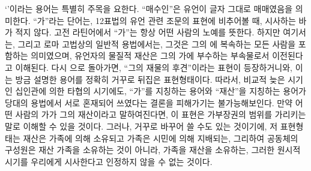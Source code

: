 `'이라는 용어는 특별히 주목을 요한다.
``매수인''은 유언이 글자 그대로 매매였음을 의미한다.
``가''라는 단어는,
12표법의 유언 관련 조문의 표현에 비추어볼 때,
시사하는 바가 적지 않다.
고전 라틴어에서 ``가''는 항상 어떤 사람의 노예를 뜻한다.
하지만 여기서는, 그리고 로마 고법상의 일반적 용법에서는,
그것은 그의 에 복속하는 모든 사람을 포함하는 의미였으며,
유언자의 물질적 재산은 그의 가에 부수하는 부속물로서
이전된다고 이해된다.
다시 으로 돌아가면, ``그의 재물의 후견''이라는
표현이 등장하거니와, 이는 방금 설명한 용어를 정확히 거꾸로 뒤집은 표현형태이다.
따라서,
비교적 늦은 시기인
십인관에 의한 타협의 시기에도,
``가''를 지칭하는 용어와 ``재산''을 지칭하는 용어가 당대의 용법에서
서로 혼재되어 쓰였다는
결론을 피해가기는 불가능해보인다.
만약 어떤 사람의 가가 그의 재산이라고 말하여진다면,
이 표현은 가부장권의 범위를 가리키는 말로 이해할 수 있을 것이다.
그러나, 거꾸로 바꾸어 쓸 수도 있는 것이기에,
저 표현형태는
재산은 가족에 의해 소유되고 가족은 시민에 의해 지배되는,
그리하여 공동체의 구성원은 재산 가족을 소유하는 것이 아니라,
가족을  재산을 소유하는,
그러한 원시적 시기를 우리에게 시사한다고
인정하지 않을 수 없는 것이다.

